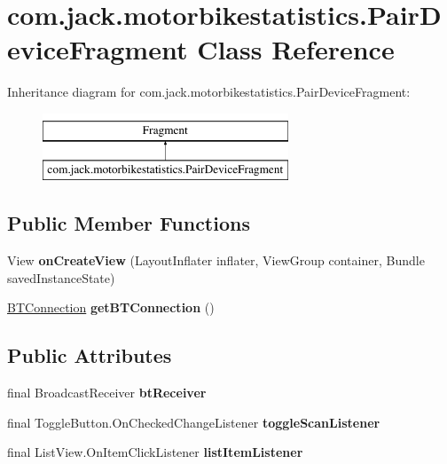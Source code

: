 \hypertarget{classcom_1_1jack_1_1motorbikestatistics_1_1_pair_device_fragment}{}\section{com.\+jack.\+motorbikestatistics.\+Pair\+Device\+Fragment Class Reference}
\label{classcom_1_1jack_1_1motorbikestatistics_1_1_pair_device_fragment}
Inheritance diagram for com.\+jack.\+motorbikestatistics.\+Pair\+Device\+Fragment\+:\begin{figure}[H]
\begin{center}
\leavevmode
\includegraphics[height=2.000000cm]{classcom_1_1jack_1_1motorbikestatistics_1_1_pair_device_fragment}
\end{center}
\end{figure}
\subsection*{Public Member Functions}
\begin{DoxyCompactItemize}
\item 
\mbox{\label{classcom_1_1jack_1_1motorbikestatistics_1_1_pair_device_fragment_afc7756a10d0798aa2493b9c7f6b010ad}} 
View {\bfseries on\+Create\+View} (Layout\+Inflater inflater, View\+Group container, Bundle saved\+Instance\+State)
\item 
\mbox{\label{classcom_1_1jack_1_1motorbikestatistics_1_1_pair_device_fragment_a32debe1358d94bb1c972137f60d1aa36}} 
\hyperlink{classcom_1_1jack_1_1motorbikestatistics_1_1_b_t_connection}{B\+T\+Connection} {\bfseries get\+B\+T\+Connection} ()
\end{DoxyCompactItemize}
\subsection*{Public Attributes}
\begin{DoxyCompactItemize}
\item 
final Broadcast\+Receiver {\bfseries bt\+Receiver}
\item 
final Toggle\+Button.\+On\+Checked\+Change\+Listener {\bfseries toggle\+Scan\+Listener}
\item 
\mbox{\label{classcom_1_1jack_1_1motorbikestatistics_1_1_pair_device_fragment_a4ec3a304c1da2bc4e4d2ca16da764e23}} 
final List\+View.\+On\+Item\+Click\+Listener {\bfseries list\+Item\+Listener}
\end{DoxyCompactItemize}

